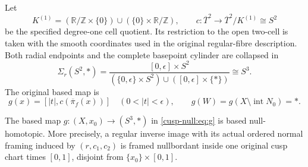 Let
\[
 K^{(1)}=(\mathbb R/\mathbb Z\times\{0\})\cup(\{0\}\times\mathbb R/\mathbb Z),\qquad
 c:\overline T^2\longrightarrow \overline T^2/K^{(1)}\cong S^2
\]
be the specified degree-one cell quotient. Its restriction to the open
two-cell is taken with the smooth coordinates used in the original
regular-fibre description. Both radial endpoints and the complete
basepoint cylinder are collapsed in
\[
 \Sigma_r(S^2,*)=
 \frac{[0,\epsilon]\times S^2}
 {(\{0,\epsilon\}\times S^2)\cup([0,\epsilon]\times\{*\})}
 \cong S^3.
\]
The original based map is
\begin{equation}
 g(x)=[|t|,c(\overline\pi_f(x))]\quad(0<|t|<\epsilon),\qquad
 g(W)=g(X\setminus\operatorname{int}N_0)=*.
 \label{cusp-null:eq:g}
\end{equation}

\begin{theorem}
\label{cusp-null:thm}
The based map \(g:(X,x_0)\to(S^3,*)\) in \eqref{cusp-null:eq:g} is based
null-homotopic. More precisely, a regular inverse image with its actual
ordered normal framing induced by \((r,c_1,c_2)\) is framed nullbordant
inside one original cusp chart times \([0,1]\), disjoint from
\(\{x_0\}\times[0,1]\).
\end{theorem}


